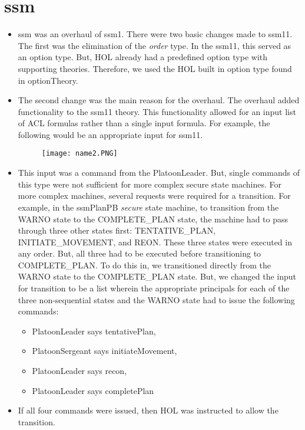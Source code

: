 \section{ssm}
\label{sec:ssm}

\begin{itemize}
\item ssm was an overhaul of ssm1.  There were two basic changes made to ssm11.  The first was the
  elimination of the \textit{order} type.  In the ssm11, this served as an option type.  But, HOL
  already had a predefined option type with supporting theories.  Therefore, we used the HOL built
  in option type found in optionTheory.
\item The second change was the main reason for the overhaul.  The overhaul added functionality
  to the ssm11 theory.  This functionality allowed for an input list of ACL formulas rather than a
  single input formula.  For example, the following would be an appropriate input for ssm11.
  \begin{figure}[h]
  \centering
  \texttt{[image: name2.PNG]}
\end{figure}
\item This input was a command from the PlatoonLeader.  But, single commands of this type were not
  sufficient for more complex secure state machines.  For more complex machines, several requests were
  required for a transition.  For example, in the ssmPlanPB \textit{secure} state machine, to transition
  from the WARNO state to the COMPLETE_PLAN state, the machine had to pass through three other states
  first: TENTATIVE_PLAN, INITIATE_MOVEMENT, and REON.  These three states were executed in any order.
  But, all three had to be executed before transitioning to COMPLETE_PLAN.  To do this in, we
  transitioned directly from the WARNO state to the COMPLETE_PLAN state.  But, we changed the input
  for transition to be a list wherein the appropriate principals for each of the three non-sequential
  states and the WARNO state had to issue the following commands:
  \begin{itemize}
  \item PlatoonLeader says tentativePlan,
   \item  PlatoonSergeant says initiateMovement, 
   \item PlatoonLeader says recon, 
   \item PlatoonLeader says completePlan
   \end{itemize}
   \item If all four commands were issued, then HOL was instructed to allow the transition.  

\end{itemize}
